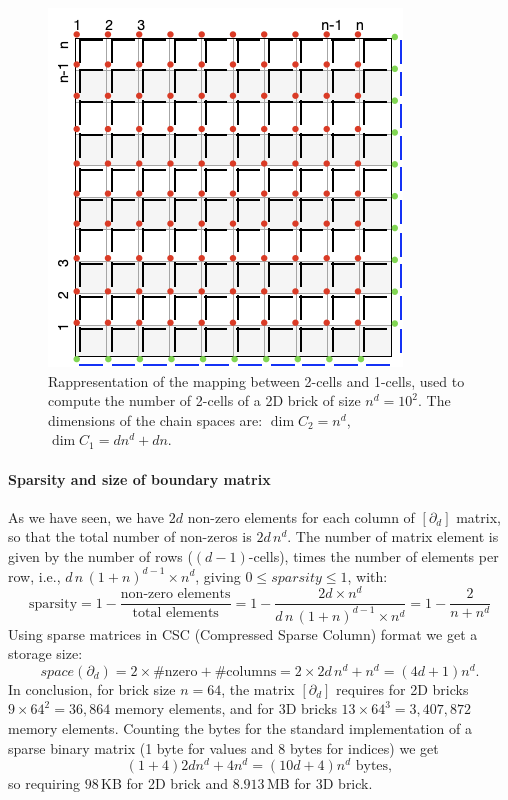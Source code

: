 \begin{figure}[htbp] %
    \centering
        \includegraphics[width=0.3\linewidth]{figs/grid2.png} 
   \caption{Rappresentation of the mapping between 2-cells and 1-cells, used to compute the number of 2-cells of a 2D brick of size $n^d = 10^2$. The dimensions of the chain spaces are: $\dim C_2 = n^d$, $\dim C_1 = d n^d + dn$.  }
\end{figure}

\paragraph{Sparsity and size of boundary matrix }\label{sec:bm-size}

As we have seen, we have $2d$ non-zero elements for each column of $[\partial_d]$ matrix, so that the total number of non-zeros is $2d\,n^d$. The number of matrix element is given by the number of rows ($(d-1)$-cells), times the number of elements per row, i.e., $d\,n\,(1+n)^{d-1} \times n^d$, giving $0 \leq sparsity \leq 1$, with: 
\[
\mbox{sparsity} = 1 - 
\frac{\mbox{non-zero\ elements}}{\mbox{total\ elements}} =  1 - 
\frac{2d\times n^d}{d\,n\,(1+n)^{d-1} \times n^d} =  1 - 
\frac{2}{n+n^d}
\]
Using sparse matrices in CSC (Compressed Sparse Column) format we get a storage size:
\[
space(\partial_d) = 2\times \#\mbox{nzero} + \#\mbox{columns} = 2\times 2d\,n^d + n^d = (4d+1)n^d.
\]
In conclusion, for brick size $n=64$, the matrix $[\partial_d]$ requires for 2D bricks $9\times 64^2=36,864$ memory elements, and for 3D bricks $13\times 64^3=3,407,872$ memory elements. Counting the bytes for the standard implementation of a sparse binary matrix (1 byte for values and 8 bytes for indices) we get 
\[
(1+4)2dn^d + 4n^d 
= (10d+4) n^d
\mbox{\ bytes},
\] 
so requiring $98$\,KB for 2D brick and $8.913$\,MB for 3D brick.





